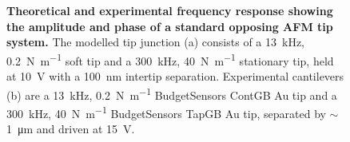 \documentclass{article}
\begin{document}
\begin{figure}[bt]
\centering
{}
\caption[Theoretical and experimental frequency response showing the amplitude and phase of a standard opposing AFM tip system]{\textbf{Theoretical and experimental frequency response showing the amplitude and phase of a standard opposing AFM tip system.} The modelled tip junction (a) consists of a \SI{13}{kHz}, \SI{0.2}{N.m^{-1}} soft tip and a \SI{300}{kHz}, \SI{40}{N.m^{-1}} stationary tip, held at \SI{10}{V} with a \SI{100}{nm} intertip separation. Experimental cantilevers (b) are a \SI{13}{kHz}, \SI{0.2}{N.m^{-1}} BudgetSensors ContGB Au tip and a \SI{300}{kHz}, \SI{40}{N.m^{-1}} BudgetSensors TapGB Au tip, separated by $\sim$\SI{1}{\micro\metre} and driven at \SI{15}{V}.}
\label{fig:frequency_response}
\end{figure}
\end{document}
